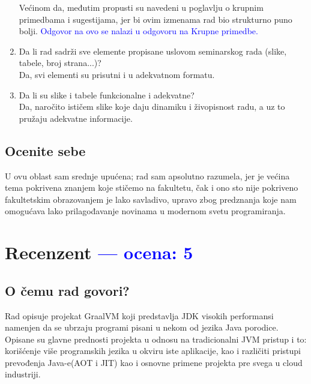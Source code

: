 \documentclass[a4paper]{report}
\newcommand{\odgovor}[1]{\textcolor{blue}{#1}}
\begin{document}
\begin{enumerate}
		Većinom da, međutim propusti su navedeni u poglavlju o krupnim primedbama i sugestijama, jer bi ovim izmenama rad bio strukturno puno bolji. \odgovor{Odgovor na ovo se nalazi u odgovoru na Krupne primedbe.}
		\item Da li rad sadrži sve elemente propisane uslovom seminarskog rada (slike, tabele, broj strana...)?\\
		Da, svi elementi su prisutni i u adekvatnom formatu.
		\item Da li su slike i tabele funkcionalne i adekvatne?\\
		Da, naročito ističem slike koje daju dinamiku i živopisnost radu, a uz to pružaju adekvatne informacije.
	\end{enumerate}
	
	\section{Ocenite sebe}
	U ovu oblast sam srednje upućena; rad sam apsolutno razumela, jer je većina tema pokrivena znanjem koje stičemo na fakultetu, čak i ono sto nije pokriveno fakultetskim obrazovanjem je lako savladivo, upravo zbog predznanja koje nam omogućava lako prilagođavanje novinama u modernom svetu programiranja.
	
	
\chapter{Recenzent \odgovor{--- ocena: 5} }


\section{O čemu rad govori?}
Rad opisuje projekat GraalVM koji predstavlja JDK visokih performansi namenjen da se ubrzaju programi pisani u nekom od jezika Java porodice.
Opisane su glavne prednosti projekta u odnosu na tradicionalni JVM pristup i to: korišćenje više programskih jezika u okviru iste aplikacije,
kao i različiti pristupi prevođenja Java-e(AOT i JIT) kao i osnovne primene projekta pre svega u cloud industriji.
\end{document}
